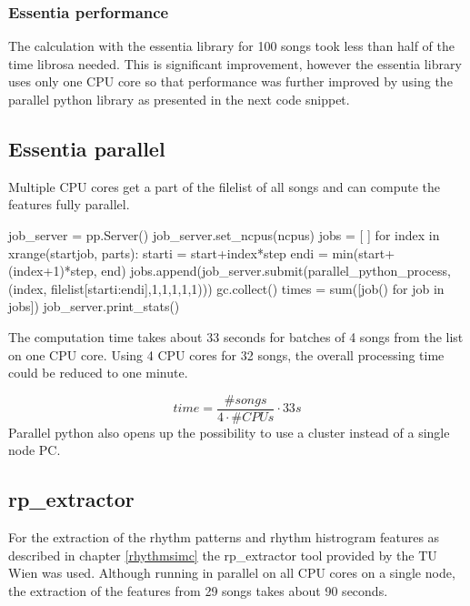 \subsubsection{Essentia performance}

The calculation with the essentia library for 100 songs took less than half of the time librosa needed. This is significant improvement, however the essentia library uses only one CPU core so that performance was further improved by using the parallel python library as presented in the next code snippet.

\subsection{Essentia parallel}

Multiple CPU cores get a part of the filelist of all songs and can compute the features fully parallel. 
\begin{pythonCode}
job_server = pp.Server()
job_server.set_ncpus(ncpus)
jobs = [ ]
for index in xrange(startjob, parts):
	starti = start+index*step
	endi = min(start+(index+1)*step, end)
	jobs.append(job_server.submit(parallel_python_process, (index, filelist[starti:endi],1,1,1,1,1)))
	gc.collect()
times = sum([job() for job in jobs])
job_server.print_stats()
\end{pythonCode}
The computation time takes about 33 seconds for batches of 4 songs from the list on one CPU core. 
Using 4 CPU cores for 32 songs, the overall processing time could be reduced to one minute.

\begin{equation} \label{eq:parallelp}
time = \frac{\#songs}{4 \cdot \#CPUs} \cdot 33s
\end{equation}
Parallel python also opens up the possibility to use a cluster instead of a single node PC. 

\subsection{rp\_extractor}

For the extraction of the rhythm patterns and rhythm histrogram features as described in chapter \ref{rhythmsimc} the rp\_extractor tool provided by the TU Wien was used. Although running in parallel on all CPU cores on a single node, the extraction of the features from 29 songs takes about 90 seconds.


